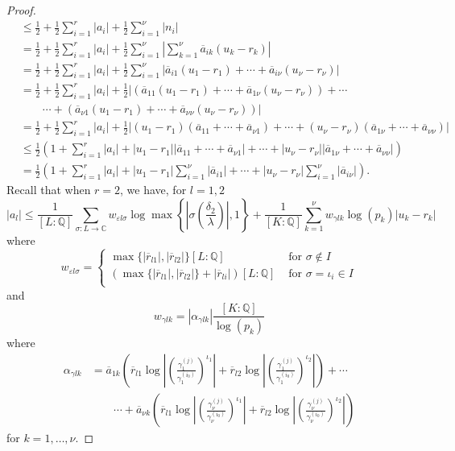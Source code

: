 \begin{proof}
\begin{align*}
	& \leq \frac{1}{2} + \frac{1}{2}\sum_{i = 1}^r |a_i| + \frac{1}{2}\sum_{i = 1}^{\nu} |n_i|\\
	& = \frac{1}{2} + \frac{1}{2}\sum_{i = 1}^r |a_i| + \frac{1}{2}\sum_{i = 1}^{\nu} \left|\sum_{k=1}^{\nu} \overline{a}_{ik}(u_k-r_k)\right|\\
	& = \frac{1}{2} + \frac{1}{2}\sum_{i = 1}^r |a_i| + \frac{1}{2}\sum_{i = 1}^{\nu} \left|\overline{a}_{i1}(u_1-r_1) + \cdots + \overline{a}_{i\nu}(u_{\nu}-r_{\nu})\right|\\
	& = \frac{1}{2} + \frac{1}{2}\sum_{i = 1}^r |a_i| + \frac{1}{2} \left|\left(\overline{a}_{11}(u_1-r_1) + \cdots + \overline{a}_{1\nu}(u_{\nu}-r_{\nu})\right) + \cdots \right.\\
	& \quad\quad \cdots + \left.\left(\overline{a}_{\nu 1}(u_1-r_1) + \cdots + \overline{a}_{\nu\nu}(u_{\nu}-r_{\nu})\right)\right|\\
	& = \frac{1}{2} + \frac{1}{2}\sum_{i = 1}^r |a_i| + \frac{1}{2} \left|(u_1-r_1)(\overline{a}_{11} + \cdots + \overline{a}_{\nu 1}) + \cdots + (u_{\nu} - r_{\nu})(\overline{a}_{1\nu} + \cdots + \overline{a}_{\nu\nu}) \right|\\
	& \leq \frac{1}{2}\left(1 + \sum_{i = 1}^r |a_i| + |u_1-r_1||\overline{a}_{11} + \cdots + \overline{a}_{\nu 1}| + \cdots + |u_{\nu} - r_{\nu}||\overline{a}_{1\nu} + \cdots + \overline{a}_{\nu\nu}|\right)\\
	& = \frac{1}{2}\left(1 + \sum_{i = 1}^r |a_i| + |u_1-r_1|\sum_{i=1}^{\nu}|\overline{a}_{i1}| + \cdots + |u_{\nu} - r_{\nu}| \sum_{i=1}^{\nu}|\overline{a}_{i\nu}|\right).
\end{align*}
Recall that when $r = 2$, we have, for $l = 1,2$
\[|a_l| \leq \frac{1}{[L:\mathbb{Q}]}\sum_{\sigma :L \to \mathbb{C}} w_{\varepsilon l \sigma}\log \max \left\{ \left|\sigma\left(\frac{\delta_2}{\lambda}\right)\right|, 1\right\} + \frac{1}{[K:\mathbb{Q}]}\sum_{k = 1}^{\nu} w_{\gamma l k}\log(p_k)|u_k - r_k|\]
where
\[w_{\varepsilon l \sigma} = 
\begin{cases}
\max\{|\overline{r}_{l1}|, |\overline{r}_{l2}|\}[L:\mathbb{Q}] & \text{ for } \sigma \notin I\\
\left(\max\{|\overline{r}_{l1}|, |\overline{r}_{l2}|\} + |\overline{r}_{li}|\right)[L:\mathbb{Q}] & \text{ for } \sigma = \iota_i \in I\\
\end{cases}\]
and 
\[w_{\gamma l k} = |\alpha_{\gamma l k}|\frac{[K:\mathbb{Q}]}{\log(p_k)}\]
where
\begin{align*}
\alpha_{\gamma l k} 
	& = \overline{a}_{1k} \left(\overline{r}_{l1} \log\left| \left( \frac{\gamma_1^{(j)}}{\gamma_1^{(i_0)}}\right)^{\iota_1}\right|+ \overline{r}_{l2}\log\left| \left( \frac{\gamma_1^{(j)}}{\gamma_1^{(i_0)}}\right)^{\iota_2}\right|\right) + \cdots \\
	& \quad \quad \cdots + \overline{a}_{\nu k} \left(\overline{r}_{l1} \log\left| \left( \frac{\gamma_{\nu}^{(j)}}{\gamma_{\nu}^{(i_0)}}\right)^{\iota_1}\right|+ \overline{r}_{l2}\log\left| \left( \frac{\gamma_{\nu}^{(j)}}{\gamma_{\nu}^{(i_0)}}\right)^{\iota_2}\right|\right)
\end{align*}
for $k = 1, \dots, \nu$.


\end{proof}
